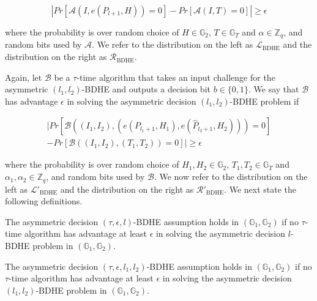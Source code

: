\begin{equation}
|Pr[\mathcal{A}(I,e(P_{l+1},H))=0]-Pr[\mathcal{A}(I,T)=0]| \geq \epsilon\nonumber
\end{equation}

\noindent where the probability is over random choice of $H\in\mathbb{G}_2$, $T\in\mathbb{G}_T$ and $\alpha\in\mathbb{Z}_q$, and random bits used by $\mathcal{A}$. We refer to the distribution on the left as ${\mathcal{L}}_{\text{BDHE}}$ and the distribution on the right as ${\mathcal{R}}_{\text{BDHE}}$. 

Again, let $\mathcal{B}$ be a $\tau$-time algorithm that takes an input challenge for the asymmetric $(l_1,l_2)$-BDHE and outputs a decision bit $b\in\{0,1\}$. We say that $\mathcal{B}$ has advantage $\epsilon$ in solving the asymmetric decision $(l_1,l_2)$-BDHE problem if 

\begin{equation}
\begin{split}
|Pr[\mathcal{B}\left((I_1,I_2),\left({e}(P_{l_1+1},H_1),{e}(\hat{P}_{l_2+1},H_2)\right)\right)=0]\\
-Pr[\mathcal{B}((I_1,I_2),(T_1,T_2))=0]| \geq \epsilon\nonumber
\end{split}
\end{equation}

\noindent where the probability is over random choice of $H_1,H_2\in\mathbb{G}_2$, $T_1,T_2\in\mathbb{G}_T$ and $\alpha_1,\alpha_2\in\mathbb{Z}_q$, and random bits used by $\mathcal{B}$. We now refer to the distribution on the left as ${\mathcal{L}'}_{\text{BDHE}}$ and the distribution on the right as ${\mathcal{R}'}_{\text{BDHE}}$. We next state the following definitions.

\begin{Definition}
 The asymmetric decision $(\tau,\epsilon,l)$-BDHE assumption holds in $(\mathbb{G}_1,\mathbb{G}_2)$ if no $\tau$-time algorithm has advantage at least $\epsilon$ in solving the asymmetric decision $l$-BDHE problem in $(\mathbb{G}_1,\mathbb{G}_2)$.
\end{Definition}
  
\begin{Definition}
 The asymmetric decision $(\tau,\epsilon,l_1,l_2)$-BDHE assumption holds in $(\mathbb{G}_1,\mathbb{G}_2)$ if no $\tau$-time algorithm has advantage at least $\epsilon$ in solving the asymmetric decision $(l_1,l_2)$-BDHE problem in $(\mathbb{G}_1,\mathbb{G}_2)$.
\end{Definition}


